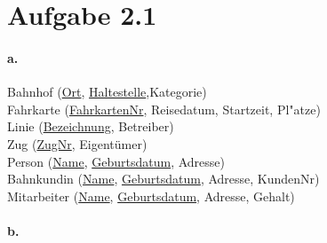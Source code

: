 \documentclass[12pt]{article}
\begin{document}
	
	
	
	
	\section*{Aufgabe 2.1}
		

		\paragraph*{a.}
			Bahnhof (\underline{Ort}, \underline{Haltestelle},Kategorie)\\[1.3em]
			
			Fahrkarte (\underline{FahrkartenNr}, Reisedatum, Startzeit, Pl"atze)\\[1.3em]
			
			Linie (\underline{Bezeichnung}, Betreiber)\\[1.3em]
			
			Zug (\underline{ZugNr}, Eigentümer)\\[1.3em]
			
			Person (\underline{Name}, \underline{Geburtsdatum}, Adresse) \\[1,3em]
			
			Bahnkundin (\underline{Name}, \underline{Geburtsdatum}, Adresse, KundenNr)\\[1,3em]
			
			Mitarbeiter (\underline{Name}, \underline{Geburtsdatum},  Adresse, Gehalt)\\[1,3em]
		
		
		\paragraph*{b.}	
			
\end{document}
